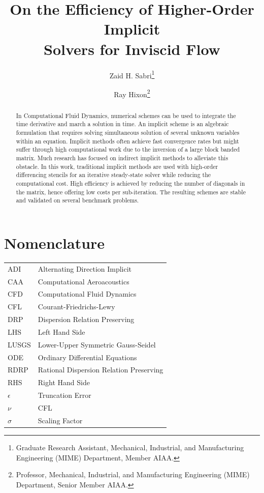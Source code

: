 \documentclass[conf]{new-aiaa}
\title{On the Efficiency of Higher-Order Implicit \\ Solvers for Inviscid Flow
}
\author{Zaid H. Sabri\footnote{Graduate Research Assistant, Mechanical, Industrial, and Manufacturing Engineering (MIME) Department, Member AIAA.}}
\author{Ray Hixon\footnote{Professor, Mechanical, Industrial, and Manufacturing Engineering (MIME) Department, Senior Member AIAA.}}
\affil{University of Toledo, Toledo, OH, 43606}
\begin{document}
\maketitle

\begin{abstract}

In Computational Fluid Dynamics, numerical schemes can be used to integrate the time derivative and march a solution in time. 
An implicit scheme is an algebraic formulation that requires solving simultaneous solution of several unknown variables within an equation. 
Implicit methods often achieve fast convergence rates but might suffer through high computational work due to the inversion of a large block banded matrix.
Much research has focused on indirect implicit methods to alleviate this obstacle.
In this work, traditional implicit methods are used with high-order differencing stencils for an iterative steady-state solver while reducing the computational cost.
High efficiency is achieved by reducing the number of diagonals in the matrix, hence offering low costs per sub-iteration.
The resulting schemes are stable and validated on several benchmark problems.
   
\end{abstract}

\section{Nomenclature}

{\renewcommand\arraystretch{1.0}
\noindent\begin{longtable*}{@{}l @{\quad=\quad} l@{}}
ADI & Alternating Direction Implicit \\
CAA  & Computational Aeroacoustics \\
CFD & Computational Fluid Dynamics \\
CFL &    Courant-Friedrichs-Lewy \\
DRP & Dispersion Relation Preserving \\
LHS & Left Hand Side \\ 
LUSGS & Lower-Upper Symmetric Gauss-Seidel \\ 
ODE & Ordinary Differential Equations \\
RDRP & Rational Dispersion Relation Preserving \\
RHS & Right Hand Side \\
$\epsilon$ & Truncation Error \\
$\nu$ & CFL \\
$\sigma$ & Scaling Factor

\end{longtable*}}
\end{document}
